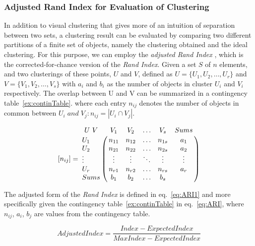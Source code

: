 \documentclass[a4paper,10pt,twoside,fleqn]{article}
\begin{document}
\subsubsection{Adjusted Rand Index for Evaluation of Clustering} 
In addition to visual clustering that gives more of an intuition of separation between two sets, a clustering result can be evaluated by 
comparing two different partitions of a finite set of objects, namely the clustering obtained and the ideal clustering. 
For this purpose, we can employ the \emph{adjusted Rand Index} \cite{Hubert1985}, which is the corrected-for-chance version of the \emph{Rand Index}. 
Given a set $S$ of $n$ elements, and two clusterings of these points, $U$ and $V$, defined as   
$U = \{ U_1, U_2, \ldots , U_r \}$ and $V = \{ V_1, V_2, \ldots , V_s \}$ with $a_i$ and $b_i$ as the number of objects in cluster $U_i$ and $V_i$ respectively.
The overlap between U and V can be summarized in a contingency table~\ref{ex:continTable}. 
where each entry $n_{ij}$ denotes the number of objects in common between $U_i\; and\; V_j: n_{ij}=|U_i \cap V_j|$.

\begin{equation} \label{ex:continTable}
 \left[n_{ij}\right]= \bordermatrix{~
U\ V &	V_1 &  V_2 &	\ldots &	V_s 	&Sums \cr
U_1 &	n_{11} &	n_{12} &	\ldots 	&n_{1s} &	a_1 \cr
U_2 &	n_{21} &	n_{22} &	\ldots &	n_{2s} &	a_2\cr
\vdots &	\vdots &	\vdots &	\ddots &	\vdots &	\vdots\cr
U_r &	n_{r1} &	n_{r2} &	\ldots &	n_{rs} &	a_r\cr
Sums &	b_1 	&b_2 	&\ldots 	&b_s &    	\cr}
 \end{equation}
 
The adjusted form of the \emph{Rand Index} is defined in eq.~\ref{eq:ARI1} and more specifically given the contingency table~\ref{ex:continTable} 
in eq.~\ref{eq:ARI}, where $n_{ij}$, $a_i$, $b_j$ are values from the contingency table. 

\begin{equation}\label{eq:ARI1}
 AdjustedIndex = \frac{Index - ExpectedIndex}{MaxIndex - ExpectedIndex}
\end{equation}

% 
% 
% 
\end{document}
